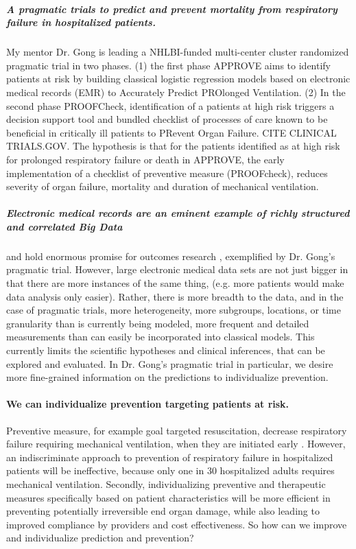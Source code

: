 \documentclass[11pt,notitlepage]{article}
\begin{document}
\subparagraph{A pragmatic trials to predict and prevent mortality from respiratory failure in hospitalized patients.}  My mentor Dr. Gong is leading a NHLBI-funded multi-center cluster randomized pragmatic trial in two phases. (1) the first phase APPROVE aims to identify patients at risk by building classical logistic regression models based on electronic medical records (EMR) to Accurately Predict PROlonged Ventilation. (2) In the second phase PROOFCheck, identification of a patients at high risk triggers a decision support tool and bundled checklist of processes of care known to be beneficial in critically ill patients to PRevent Organ Failure. CITE CLINICAL TRIALS.GOV. The hypothesis is that for the patients identified as at high risk for prolonged respiratory failure or death in APPROVE, the early implementation of a checklist of preventive measure (PROOFcheck), reduces severity of organ failure, mortality and duration of mechanical ventilation. 

\subparagraph{Electronic medical records are an eminent example of richly structured and correlated Big Data} 
and hold enormous promise for outcomes research \cite{Dean_19279318,Amarasingham20940649},  exemplified by Dr. Gong's pragmatic trial. However, large electronic medical data sets are not just bigger in that there are more instances of the same thing, (e.g. more patients would make data analysis only easier).  Rather, there is more breadth to the data, and in the case of pragmatic trials, more heterogeneity, more subgroups, locations, or time granularity than is currently being modeled, more frequent and detailed measurements than can easily be incorporated into classical models.  This currently limits the scientific hypotheses and clinical inferences, that can be explored and evaluated. In Dr. Gong's pragmatic trial in particular, we desire more fine-grained information on the predictions to individualize prevention.  

\paragraph*{We can individualize prevention targeting patients at risk.}
Preventive measure, for example goal targeted resuscitation, decrease respiratory failure requiring mechanical ventilation, when they are initiated early \cite{Rivers_12594312}. However, an indiscriminate approach to prevention of respiratory failure in hospitalized patients will be ineffective, because only one in 30 hospitalized adults requires mechanical ventilation. Secondly, individualizing preventive and therapeutic measures specifically based on patient characteristics will be more efficient in preventing potentially irreversible end organ damage, while also  leading to improved compliance by providers and cost effectiveness. So how can we improve and individualize prediction and prevention? 
\end{document}
